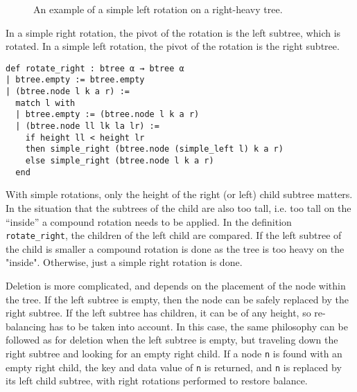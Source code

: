 \begin{figure}[!ht]
  \begin{subfigure}{0.5\textwidth}
    \centering
  \end{subfigure}%
  \begin{subfigure}{0.5\textwidth}
    \centering
  \end{subfigure}
  \label{fig:rotation}
  \caption{An example of a simple left rotation on a right-heavy tree.}
\end{figure}

In a simple right rotation, the pivot of the rotation is the left subtree, which is rotated. In a simple left rotation, the pivot of the rotation is the right subtree.

\begin{lstlisting}
def rotate_right : btree α → btree α
| btree.empty := btree.empty
| (btree.node l k a r) :=
  match l with
  | btree.empty := (btree.node l k a r)
  | (btree.node ll lk la lr) :=
    if height ll < height lr 
    then simple_right (btree.node (simple_left l) k a r)
    else simple_right (btree.node l k a r)
  end 
\end{lstlisting}

With simple rotations, only the height of the right (or left) child subtree matters. In the situation that the subtrees of the child are also too tall, i.e. too tall on the \enquote{inside} a compound rotation needs to be applied. In the definition \lstinline{rotate_right}, the children of the left child are compared. If the left subtree of the child is smaller a compound rotation is done as the tree is too heavy on the "inside". Otherwise, just a simple right rotation is done.

Deletion is more complicated, and depends on the placement of the node within the tree. If the left subtree is empty, then the node can be safely replaced by the right subtree.  If the left subtree has children, it can be of any height, so re-balancing has to be taken into account. In this case, the same philosophy can be followed as for deletion when the left subtree is empty, but traveling down the right subtree and looking for an empty right child. If a node \lstinline{n} is found with an empty right child, the key and data value of \lstinline{n} is returned, and \lstinline{n} is replaced by its left child subtree, with right rotations performed to restore balance. 

